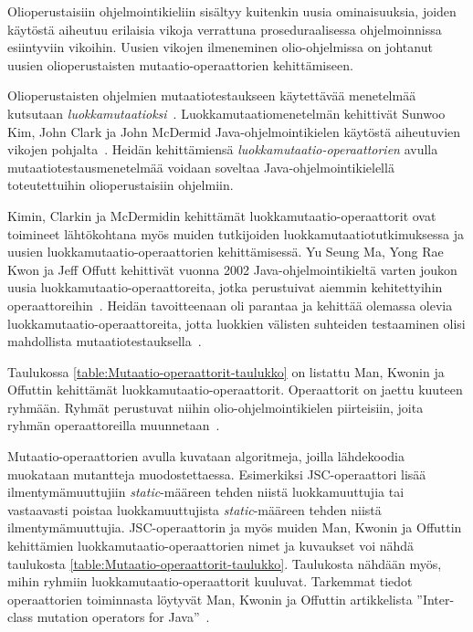 \documentclass[finnish, grading]{tktltiki2}
\theoremstyle{definition}
\theoremstyle{remark}
\begin{document}
Olioperustaisiin ohjelmointikieliin sisältyy kuitenkin uusia ominaisuuksia, joiden käytöstä aiheutuu erilaisia vikoja verrattuna proseduraalisessa ohjelmoinnissa esiintyviin vikoihin. Uusien vikojen ilmeneminen olio-ohjelmissa on johtanut uusien olioperustaisten mutaatio-operaattorien kehittämiseen.  

Olioperustaisten ohjelmien mutaatiotestaukseen käytettävää menetelmää kutsutaan \textit{luokkamutaatioksi}~\cite{Kim:Clark:McDermid:2000}. Luokkamutaatiomenetelmän kehittivät Sunwoo Kim, John Clark ja John McDermid Java-oh\-jel\-moin\-ti\-kie\-len käytöstä aiheutuvien vikojen pohjalta~\cite{Kim:Clark:McDermid:2000}. Heidän kehittämiensä \textit{luokkamutaatio-operaattorien} avulla mutaatiotestausmenetelmää voidaan soveltaa Java-ohjelmointikielellä toteutettuihin olioperustaisiin ohjelmiin.

Kimin, Clarkin ja McDermidin kehittämät luokkamutaatio-operaattorit ovat toimineet lähtökohtana myös muiden tutkijoiden luokkamutaatiotutkimuksessa ja uusien luokkamutaatio-operaattorien kehittämisessä. Yu Seung Ma, Yong Rae Kwon ja Jeff Offutt kehittivät vuonna 2002 Java-oh\-jel\-moin\-ti\-kiel\-tä varten joukon uusia luokkamutaatio-operaattoreita, jotka perustuivat aiemmin kehitettyihin operaattoreihin~\cite[s. 352]{Ma:Kwon:Offutt:2002}. Heidän tavoitteenaan oli parantaa ja kehittää olemassa olevia luokkamutaatio-operaattoreita, jotta luokkien välisten suhteiden testaaminen olisi mahdollista mutaatiotestauksella~\cite[s. 362]{Ma:Kwon:Offutt:2002}.

Taulukossa \ref{table:Mutaatio-operaattorit-taulukko} on listattu Man, Kwonin ja Offuttin kehittämät luok\-ka\-mu\-taa\-ti\-o-o\-pe\-raat\-to\-rit. Operaattorit on jaettu kuuteen ryhmään. Ryhmät perustuvat niihin olio-ohjelmointikielen piirteisiin, joita ryhmän operaattoreilla muunnetaan~\cite[s. 355]{Ma:Kwon:Offutt:2002}.

Mutaatio-operaattorien avulla kuvataan algoritmeja, joilla lähdekoodia muokataan mutantteja muodostettaessa. Esimerkiksi JSC-operaattori lisää ilmentymämuuttujiin \textit{static}-määreen tehden niistä luokkamuuttujia tai vastaavasti poistaa luokkamuuttujista \textit{static}-määreen tehden niistä ilmentymämuuttujia. JSC-operaattorin ja myös muiden Man, Kwonin ja Offuttin kehittämien luokkamutaatio-operaattorien nimet ja kuvaukset voi nähdä taulukosta \ref{table:Mutaatio-operaattorit-taulukko}. Taulukosta nähdään myös, mihin ryhmiin luokkamutaatio-operaattorit kuuluvat. Tarkemmat tiedot operaattorien toiminnasta löytyvät Man, Kwonin ja Offuttin artikkelista ''Inter-class mutation operators for Java''~\cite{Ma:Kwon:Offutt:2002}. 
\end{document}
